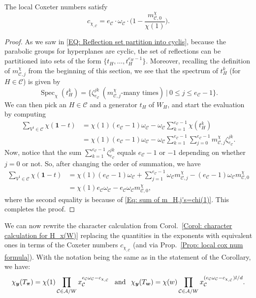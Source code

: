 \documentclass[ALCO, Unicode]{cedram}
\newcommand{\op}[1]{\operatorname{#1}}
\newcommand{\op}[1]{\operatorname{#1}}
\begin{document}
\begin{prop}\label{Prop: local cox num formula}
The local Coxeter numbers satisfy $$c_{\chi_{,\mathcal{C}}}=e_{\mathcal{C}}\cdot\omega_{\mathcal{C}}\cdot\Big(1-\dfrac{m^{\chi}_{\mathcal{C},0}}{\chi(1)}\Big).$$
\end{prop}
\begin{proof}
As we saw in \eqref{EQ: Reflection set partition into cyclis}, because the parabolic groups for hyperplanes are cyclic, the set of reflections can be partitioned into sets of the form $\{t_H,\ldots,t^{e_H-1}_H\}$. Moreover, recalling the definition of $m^{\chi}_{\mathcal{C},j}$ from the beginning of this section, we see that the spectrum of $t_H^k$ (for $H\in\mathcal{C}$) is given by $$\op{Spec}_{\chi}(t_H^k)=\{ \zeta_{e_{\mathcal{C}}}^{jk}\ (m^{\chi}_{\mathcal{C},j}\text{-many times})\ |\ 0\leq j\leq e_{\mathcal{C}}-1\}.$$ We can then pick an $H\in\mathcal{C}$ and a generator $t_H$ of $W_H$, and start the evaluation by computing \begin{align*}
\sum_{V^t\in\mathcal{C}}\chi(\bm 1-t)&=\chi(1)(e_{\mathcal{C}}-1)\omega_{\mathcal{C}}-\omega_{\mathcal{C}}\sum_{k=1}^{e_{\mathcal{C}}-1}\chi(t_H^k)\\
&=\chi(1)(e_{\mathcal{C}}-1)\omega_{\mathcal{C}}-\omega_{\mathcal{C}}\sum_{k=1}^{e_{\mathcal{C}}-1}\sum_{j=0}^{e_{\mathcal{C}}-1}m^{\chi}_{\mathcal{C},j}\zeta_{e_{\mathcal{C}}}^{jk}.
\end{align*}
Now, notice that the sum $\sum_{k=1}^{e_{\mathcal{C}}-1}\zeta_{e_{\mathcal{C}}}^{jk}$ equals $e_{\mathcal{C}}-1$ or $-1$ depending on whether $j=0$ or not. So, after changing the order of summation, we have \begin{align*}
\sum_{V^t\in\mathcal{C}}\chi(\bm 1-t)&=\chi(1)(e_{\mathcal{C}}-1)\omega_{\mathcal{C}}+\sum_{j=1}^{e_{\mathcal{C}}-1}\omega_{\mathcal{C}}m^{\chi}_{\mathcal{C},j}-(e_{\mathcal{C}}-1)\omega_{\mathcal{C}}m^{\chi}_{\mathcal{C},0}\\
&=\chi(1)e_{\mathcal{C}}\omega_{\mathcal{C}}-e_{\mathcal{C}}\omega_{\mathcal{C}}m^{\chi}_{\mathcal{C},0},
\end{align*}where the second equality is because of \eqref{Eq: sum of m_H,j's=chi(1)}. This completes the proof.
\end{proof}

We can now rewrite the character calculation from Corol.~\ref{Corol: character calculation for H_x(W)} replacing the quantities in the exponents with equivalent ones in terms of the Coxeter numbers $c_{\chi_{,\mathcal{C}}}$ (and via Prop.~\ref{Prop: local cox num formula}). With the notation being the same as in the statement of the Corollary, we have: \begin{equation}
\chi_{\bm y}(T_{\bm \pi})=\chi(1)\prod_{\mathcal{C}\in\mathcal{A}/W}x_{\mathcal{C}}^{e_{\mathcal{C}}\omega_{\mathcal{C}}-c_{\chi_{,\mathcal{C}}}}\hspace{1.5mm}\text{ and }\hspace{1.5mm}\chi_{\bm y}(T_{\bm w})=\chi(w)\prod_{\mathcal{C}\in\mathcal{A}/W}x_{\mathcal{C}}^{(e_{\mathcal{C}}\omega_{\mathcal{C}}-c_{\chi_{,\mathcal{C}}})l/d}.\label{EQ: character values via local Coxeter}\end{equation}
\end{document}
